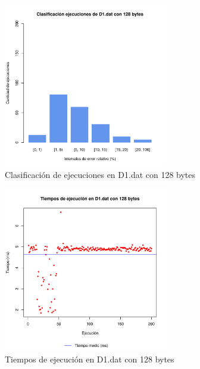 \begin{figure}[h!]
    \centering
        \includegraphics[width=0.64\textwidth]{../figs/D1/plot_count_128.pdf}
        \caption{Clasificación de ejecuciones en D1.dat con 128 bytes}
    \label{figura:D1_count_128}
\end{figure}

\begin{figure}[h!]
    \centering
        \includegraphics[width=0.64\textwidth]{../figs/D1/plot_time_128.pdf}
        \caption{Tiempos de ejecución en D1.dat con 128 bytes}
    \label{figura:D1_time_128}
\end{figure}

\clearpage
